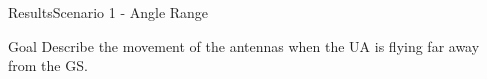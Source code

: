 
\begin{frame}{Results}{Scenario 1 - Angle Range}

  \begin{block}{Goal}
	Describe the movement of the antennas when the UA is flying far away from the GS. 
  \end{block}

  \begin{figure}[H]
    \centerline{
    \hfill
    }
  \end{figure}

\end{frame}



